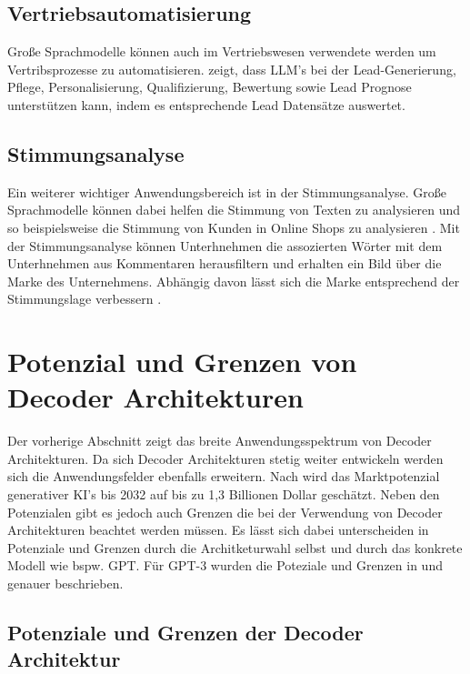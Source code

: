 \documentclass[conference]{IEEEtran}
\begin{document}
\subsection{Vertriebsautomatisierung}
Große Sprachmodelle können auch im Vertriebswesen verwendete werden um Vertribsprozesse zu automatisieren. \cite{keary12PraktischeLarge2023} zeigt, dass LLM's bei der Lead-Generierung, Pflege, Personalisierung, Qualifizierung, Bewertung sowie Lead Prognose unterstützen kann, indem es entsprechende Lead Datensätze auswertet.
\subsection{Stimmungsanalyse}
Ein weiterer wichtiger Anwendungsbereich ist in der Stimmungsanalyse. Große Sprachmodelle können dabei helfen die Stimmung von Texten zu analysieren und so beispielsweise die Stimmung von Kunden in Online Shops zu analysieren \cite{keary12PraktischeLarge2023}. Mit der Stimmungsanalyse können Unterhnehmen die assozierten Wörter mit dem Unterhnehmen aus Kommentaren herausfiltern und erhalten ein Bild über die Marke des Unternehmens. Abhängig davon lässt sich die Marke entsprechend der Stimmungslage verbessern \cite{keary12PraktischeLarge2023}.

\section{Potenzial und Grenzen von Decoder Architekturen}
Der vorherige Abschnitt zeigt das breite Anwendungsspektrum von Decoder Architekturen. Da sich Decoder Architekturen stetig weiter entwickeln werden sich die Anwendungsfelder ebenfalls erweitern. Nach \cite{keary12PraktischeLarge2023} wird das Marktpotenzial generativer KI's bis 2032 auf bis zu 1,3 Billionen Dollar geschätzt. Neben den Potenzialen gibt es jedoch auch Grenzen die bei der Verwendung von Decoder Architekturen beachtet werden müssen. Es lässt sich dabei unterscheiden in Potenziale und Grenzen durch die Architketurwahl selbst und durch das konkrete Modell wie bspw. GPT.  Für GPT-3 wurden die Poteziale und Grenzen in \cite{radfordLanguageModelsAre} und \cite{openaiGPT4TechnicalReport2024} genauer beschrieben.
\subsection{Potenziale und Grenzen der Decoder Architektur}
\end{document}
